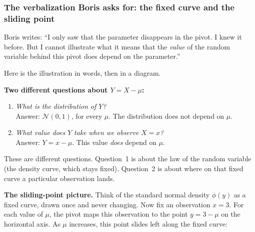 \documentclass[a4paper,oneside,12pt]{extarticle}
\theoremstyle{plain}
\theoremstyle{definition}
\theoremstyle{remark}
\begin{document}
\subsubsection*{The verbalization Boris asks for: the fixed curve and the sliding point}

Boris writes: ``I only saw that the parameter disappears in the pivot.
I knew it before.  But I cannot illustrate what it means that the
\emph{value} of the random variable behind this pivot does depend on
the parameter.''

Here is the illustration in words, then in a diagram.

\medskip
\noindent\textbf{Two different questions about $Y = X - \mu$:}

\begin{enumerate}
\item \textit{What is the distribution of $Y$?}\\
  Answer: $\mathcal{N}(0,1)$, for every $\mu$.
  The distribution does not depend on $\mu$.

\item \textit{What value does $Y$ take when we observe $X = x$?}\\
  Answer: $Y = x - \mu$.
  This value \emph{does} depend on $\mu$.
\end{enumerate}

These are different questions.  Question~1 is about the law of
the random variable (the density curve, which stays fixed).
Question~2 is about where on that fixed curve a particular
observation lands.

\medskip
\noindent\textbf{The sliding-point picture.}
Think of the standard normal density $\phi(y)$ as a fixed curve,
drawn once and never changing.  Now fix an observation $x = 3$.
For each value of $\mu$, the pivot maps this observation to the
point $y = 3 - \mu$ on the horizontal axis.  As $\mu$ increases,
this point slides left along the fixed curve:
\end{document}
